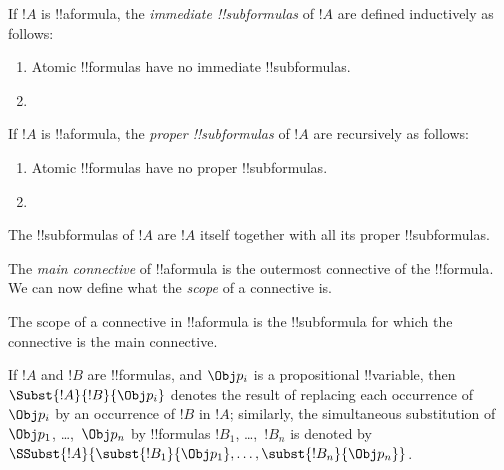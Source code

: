 \documentclass[../../../include/open-logic-section]{subfiles}
\begin{document}
\begin{defn}
If $!A$ is !!a{formula}, the \emph{immediate !!{subformula}s}
of $!A$ are defined inductively as follows:
\begin{enumerate}
\item Atomic !!{formula}s have no immediate !!{subformula}s.


\item {}

\end{enumerate}
\end{defn}

\begin{defn}
If $!A$ is !!a{formula}, the \emph{proper !!{subformula}s}
of $!A$ are recursively as follows:
\begin{enumerate}
\item Atomic !!{formula}s have no proper !!{subformula}s.


\item {}
\end{enumerate}
\end{defn}

\begin{defn}[!!^{subformula}]
The !!{subformula}s of $!A$ are $!A$ itself together with all its
proper !!{subformula}s.
\end{defn}

The \emph{main connective} of !!a{formula} is the outermost connective of 
the !!{formula}. We can now define what the \emph{scope} of a connective is.

\begin{defn}[Scope]
The scope of a connective in !!a{formula} is the !!{subformula}
for which the connective is the main connective.
\end{defn}

\begin{defn}
If $!A$ and $!B$ are !!{formula}s, and $\Obj p_i$ is a propositional
!!{variable}, then $\Subst{!A}{!B}{\Obj p_i}$ denotes the result of
replacing each occurrence of $\Obj p_i$ by an occurrence of $!B$ in $!A$;
similarly, the simultaneous substitution of $\Obj p_1$, \dots,~$\Obj p_n$ by
!!{formula}s $!B_1$, \dots,~$!B_n$ is denoted by
$\SSubst{!A}{\subst{!B_1}{\Obj p_1},\dots,\subst{!B_n}{\Obj p_n}}$.
\end{defn}
\end{document}
